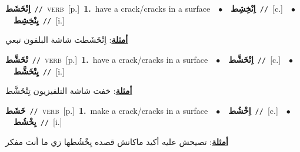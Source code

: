\documentclass[10pt,a4paper,twoside]{article} %
\begin{document}
\begin{multicols}{2}
{\setlength\topsep{0pt}\textbf{\foreignlanguage{arabic}{اِنْخَشَط}}\ {\color{gray}\texttt{//}\color{black}}\ \textsc{verb}\ [p.]\ \textbf{1.}~have a crack/cracks in a surface\ \ $\bullet$\ \ \setlength\topsep{0pt}\textbf{\foreignlanguage{arabic}{اِنْخِشِط}}\ {\color{gray}\texttt{//}\color{black}}\ [c.]\ \ $\bullet$\ \ \setlength\topsep{0pt}\textbf{\foreignlanguage{arabic}{يِنْخِشِط}}\ {\color{gray}\texttt{//}\color{black}}\ [i.]\  \begin{flushright}\color{gray}\foreignlanguage{arabic}{\textbf{\underline{\foreignlanguage{arabic}{أمثلة}}}: اِنْخَشَطت شاشة البلفون تبعي}\end{flushright}\color{black}} \vspace{2mm}

{\setlength\topsep{0pt}\textbf{\foreignlanguage{arabic}{تْخَشَّط}}\ {\color{gray}\texttt{//}\color{black}}\ \textsc{verb}\ [p.]\ \textbf{1.}~have a crack/cracks in a surface\ \ $\bullet$\ \ \setlength\topsep{0pt}\textbf{\foreignlanguage{arabic}{اِتْخَشَّط}}\ {\color{gray}\texttt{//}\color{black}}\ [c.]\ \ $\bullet$\ \ \setlength\topsep{0pt}\textbf{\foreignlanguage{arabic}{يِتْخَشَّط}}\ {\color{gray}\texttt{//}\color{black}}\ [i.]\  \begin{flushright}\color{gray}\foreignlanguage{arabic}{\textbf{\underline{\foreignlanguage{arabic}{أمثلة}}}: خفت شاشة التلفيزيون تِتْخَشَّط}\end{flushright}\color{black}} \vspace{2mm}

{\setlength\topsep{0pt}\textbf{\foreignlanguage{arabic}{خَشَط}}\ {\color{gray}\texttt{//}\color{black}}\ \textsc{verb}\ [p.]\ \textbf{1.}~make a crack/cracks in a surface\ \ $\bullet$\ \ \setlength\topsep{0pt}\textbf{\foreignlanguage{arabic}{اِخْشُط}}\ {\color{gray}\texttt{//}\color{black}}\ [c.]\ \ $\bullet$\ \ \setlength\topsep{0pt}\textbf{\foreignlanguage{arabic}{يِخْشُط}}\ {\color{gray}\texttt{//}\color{black}}\ [i.]\  \begin{flushright}\color{gray}\foreignlanguage{arabic}{\textbf{\underline{\foreignlanguage{arabic}{أمثلة}}}: تصيحش عليه أكيد ماكانش قصده يِخْشُطها زي ما أنت مفكر}\end{flushright}\color{black}} \vspace{2mm}


\end{multicols}
\end{document}
